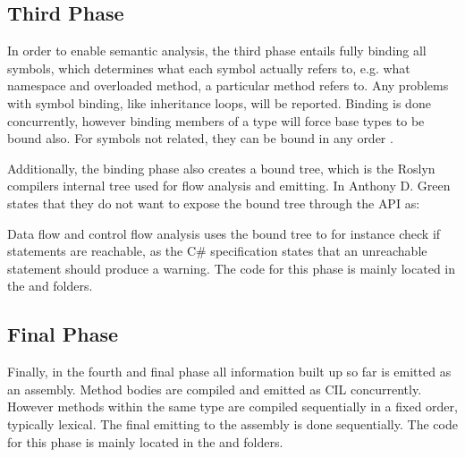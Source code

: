 \subsection{Third Phase}
In order to enable semantic analysis, the third phase entails fully binding all symbols, which determines what each symbol actually refers to, e.g. what namespace and overloaded method, a particular method refers to. Any problems with symbol binding, like inheritance loops, will be reported. Binding is done concurrently, however binding members of a type will force base types to be bound also. For symbols not related, they can be bound in any order \cite{sadovRoslynPerf}.

Additionally, the binding phase also creates a bound tree, which is the Roslyn compilers internal tree used for flow analysis and emitting. In \cite{roslynBinder} Anthony D. Green states that they do not want to expose the bound tree through the \ac{API} as:


Data flow and control flow analysis uses the bound tree to for instance check if statements are reachable, as the C\# specification states that an unreachable statement should produce a warning\cite{gafter2011}. The code for this phase is mainly located in the   and  folders.

\subsection{Final Phase}
Finally, in the fourth and final phase all information built up so far is emitted as an assembly. Method bodies are compiled and emitted as \ac{CIL} concurrently. However methods within the same type are compiled sequentially in a fixed order, typically lexical. The final emitting to the assembly is done sequentially\cite{sadovRoslynPerf}. The code for this phase is mainly located in the  and  folders.

